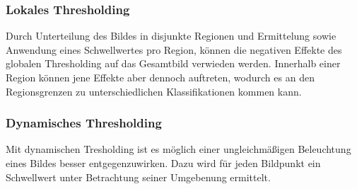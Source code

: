 \subsubsection*{Lokales Thresholding}
Durch Unterteilung des Bildes in disjunkte Regionen und Ermittelung sowie Anwendung eines Schwellwertes pro Region, können die negativen Effekte des globalen Thresholding auf das Gesamtbild verwieden werden.
Innerhalb einer Region können jene Effekte aber dennoch auftreten, wodurch es an den Regionsgrenzen zu unterschiedlichen Klassifikationen kommen kann.

\subsubsection*{Dynamisches Thresholding}
Mit dynamischen Tresholding ist es möglich einer ungleichmäßigen Beleuchtung eines Bildes besser entgegenzuwirken.
Dazu wird für jeden Bildpunkt ein Schwellwert unter Betrachtung seiner Umgebenung ermittelt.

